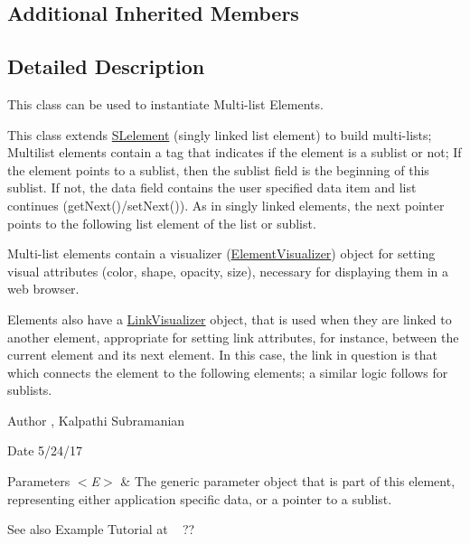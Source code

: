 \subsection*{Additional Inherited Members}


\subsection{Detailed Description}
This class can be used to instantiate Multi-\/list Elements. 

This class extends \hyperlink{namespace_s_lelement}{S\+Lelement} (singly linked list element) to build multi-\/lists; Multilist elements contain a tag that indicates if the element is a sublist or not; If the element points to a sublist, then the sublist field is the beginning of this sublist. If not, the data field contains the user specified data item and list continues (get\+Next()/set\+Next()). As in singly linked elements, the next pointer points to the following list element of the list or sublist.

Multi-\/list elements contain a visualizer (\hyperlink{namespace_element_visualizer}{Element\+Visualizer}) object for setting visual attributes (color, shape, opacity, size), necessary for displaying them in a web browser.

Elements also have a \hyperlink{namespace_link_visualizer}{Link\+Visualizer} object, that is used when they are linked to another element, appropriate for setting link attributes, for instance, between the current element and its next element. In this case, the link in question is that which connects the element to the following elements; a similar logic follows for sublists.

\begin{DoxyAuthor}{Author}
, Kalpathi Subramanian
\end{DoxyAuthor}
\begin{DoxyDate}{Date}
5/24/17
\end{DoxyDate}

\begin{DoxyParams}{Parameters}
{\em $<$\+E$>$} & The generic parameter object that is part of this element, representing either application specific data, or a pointer to a sublist.\\
\hline
\end{DoxyParams}
\begin{DoxySeeAlso}{See also}
Example Tutorial at ~\newline
 ?? 
\end{DoxySeeAlso}


